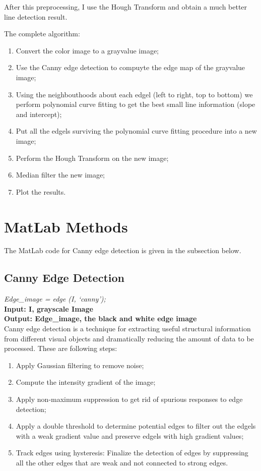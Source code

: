 After this preprocessing, I use the Hough Transform and obtain
a much better line detection result.

The complete algorithm:
\begin{enumerate}
    \item Convert the color image to a grayvalue image;
    \item Use the Canny edge detection to compuyte the edge map of the grayvalue image;
    \item Using the neighbouthoods about each edgel (left to right, top to bottom)
          we perform polynomial curve fitting to get the best small line
          information (slope and intercept);
    \item Put all the edgels surviving the polynomial curve fitting procedure
          into a new image;
    \item Perform the Hough Transform on the new image;
    \item Median filter the new image;
    \item Plot the results.
\end{enumerate}

\section{MatLab Methods}

The MatLab code for Canny edge detection is given in the subsection below.

\subsection{Canny Edge Detection}
\vspace{3mm}
\textit{Edge\_image = edge (I, \lq{canny}\rq);}\\
\textbf{Input: I, grayscale Image}\\
\textbf{Output: Edge\_image, the black and white edge image}\\
\newline
Canny edge detection is a technique for extracting useful structural
information from different visual objects and dramatically reducing
the amount of data to be processed. These are following steps:
\begin{enumerate}
\item Apply Gaussian filtering to remove noise;
\item Compute the intensity gradient of the image;
\item Apply non-maximum suppression to get rid of spurious responses to edge detection;
\item Apply a double threshold to determine potential edges to filter out the
edgels with a weak gradient value and preserve edgels with high gradient values;
\item Track edges using hysteresis: Finalize the detection of edges by suppressing
all the other edges that are weak and not connected to strong edges.
\end{enumerate}



